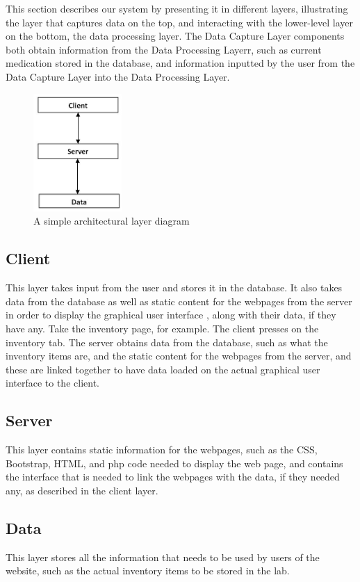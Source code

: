 This section describes our system by presenting it in different layers, illustrating the layer that captures data on the top, and interacting with the lower-level layer on the bottom, the data processing layer. The Data Capture Layer components both obtain information from the Data Processing Layerr, such as current medication stored in the database, and information inputted by the user from the Data Capture Layer into the Data Processing Layer.  

\begin{figure}[h!]
	\centering
 	\includegraphics[width=0.3\textwidth]{images/LayerBlockDiagram}
 \caption{A simple architectural layer diagram}
\end{figure}

\subsection{Client}
This layer takes input from the user and stores it in the database. It also takes data from the database as well as static content for the webpages from the server in order to display the graphical user interface , along with their data, if they have any. Take the inventory page, for example. The client presses on the inventory tab. The server obtains data from the database, such as what the inventory items are, and the static content for the webpages from the server, and these are linked together to have data loaded on the actual graphical user interface to the client. 

\subsection{Server}
This layer contains static information for the webpages, such as the CSS, Bootstrap, HTML, and php code needed to display the web page, and contains the interface that is needed to link the webpages with the data, if they needed any, as described in the client layer.

\subsection{Data}
This layer stores all the information that needs to be used by users of the website, such as the actual inventory items to be stored in the lab. 